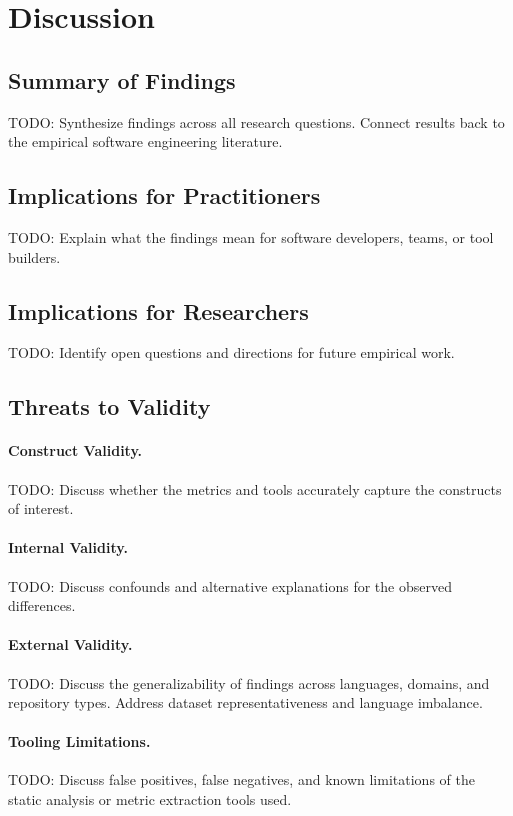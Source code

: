 \section{Discussion}
\label{sec:discussion}

\subsection{Summary of Findings}
\label{sec:discussion-summary}

TODO: Synthesize findings across all research questions. Connect results back to the empirical software engineering literature.

\subsection{Implications for Practitioners}
\label{sec:discussion-practitioners}

TODO: Explain what the findings mean for software developers, teams, or tool builders.

\subsection{Implications for Researchers}
\label{sec:discussion-researchers}

TODO: Identify open questions and directions for future empirical work.

\subsection{Threats to Validity}
\label{sec:threats}

\paragraph{Construct Validity.}
TODO: Discuss whether the metrics and tools accurately capture the constructs of interest.

\paragraph{Internal Validity.}
TODO: Discuss confounds and alternative explanations for the observed differences.

\paragraph{External Validity.}
TODO: Discuss the generalizability of findings across languages, domains, and repository types. Address dataset representativeness and language imbalance.

\paragraph{Tooling Limitations.}
TODO: Discuss false positives, false negatives, and known limitations of the static analysis or metric extraction tools used.
